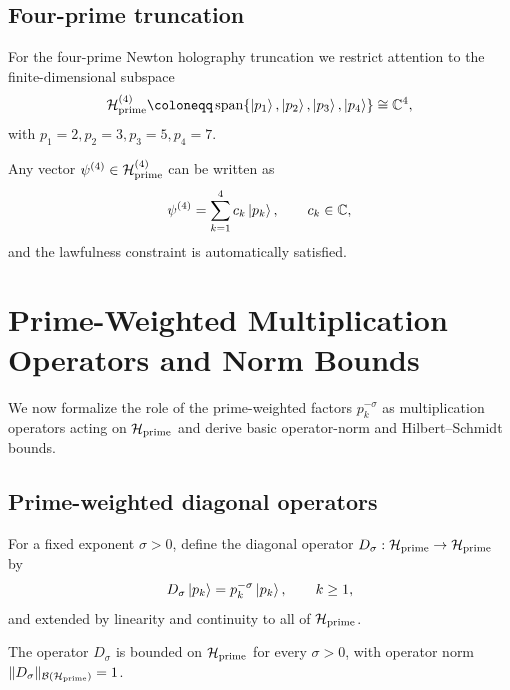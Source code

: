 \documentclass[11pt]{article}
\begin{document}
\subsection{Four-prime truncation}

For the four-prime Newton holography truncation we restrict attention to
the finite-dimensional subspace
\begin{equation}
  \mathcal{H}_{\rm prime}^{(4)}
  \coloneqq \operatorname{span}\{\ket{p_1},\ket{p_2},\ket{p_3},\ket{p_4}\}
  \cong \mathbb{C}^4,
\end{equation}
with \(p_1=2,p_2=3,p_3=5,p_4=7\).

Any vector \(\psi^{(4)} \in \mathcal{H}_{\rm prime}^{(4)}\) can be
written as
\begin{equation}
  \psi^{(4)} = \sum_{k=1}^4 c_k \ket{p_k},
  \qquad c_k\in\mathbb{C},
\end{equation}
and the lawfulness constraint is automatically satisfied.

\section{Prime-Weighted Multiplication Operators and Norm Bounds}

We now formalize the role of the prime-weighted factors \(p_k^{-\sigma}\)
as multiplication operators acting on \(\mathcal{H}_{\rm prime}\) and
derive basic operator-norm and Hilbert--Schmidt bounds.

\subsection{Prime-weighted diagonal operators}

\begin{definition}
For a fixed exponent \(\sigma > 0\), define the diagonal operator
\(D_\sigma : \mathcal{H}_{\rm prime} \to \mathcal{H}_{\rm prime}\) by
\begin{equation}
  D_\sigma \ket{p_k} = p_k^{-\sigma} \ket{p_k},
  \qquad k\ge 1,
\end{equation}
and extended by linearity and continuity to all of
\(\mathcal{H}_{\rm prime}\).
\end{definition}

\begin{lemma}
The operator \(D_\sigma\) is bounded on \(\mathcal{H}_{\rm prime}\) for
every \(\sigma>0\), with operator norm
\(\|D_\sigma\|_{\mathcal{B}(\mathcal{H}_{\rm prime})}=1\).
\end{lemma}
\end{document}
